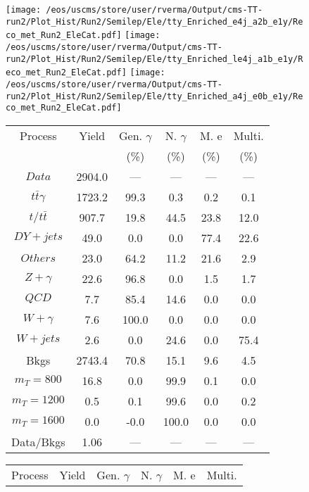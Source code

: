 \begin{figure}
\centering
\texttt{[image: /eos/uscms/store/user/rverma/Output/cms-TT-run2/Plot\_Hist/Run2/Semilep/Ele/tty\_Enriched\_e4j\_a2b\_e1y/Reco\_met\_Run2\_EleCat.pdf]}
\texttt{[image: /eos/uscms/store/user/rverma/Output/cms-TT-run2/Plot\_Hist/Run2/Semilep/Ele/tty\_Enriched\_le4j\_a1b\_e1y/Reco\_met\_Run2\_EleCat.pdf]}
\texttt{[image: /eos/uscms/store/user/rverma/Output/cms-TT-run2/Plot\_Hist/Run2/Semilep/Ele/tty\_Enriched\_a4j\_e0b\_e1y/Reco\_met\_Run2\_EleCat.pdf]}
\begin{minipage}[c]{0.32\textwidth}
\centering
\tiny{
\begin{tabular}{cccccc}
\hline
Process & Yield & Gen. $\gamma$ & N. $\gamma$ & M. e & Multi. \\
 &  & (\%) & (\%) & (\%) & (\%)  \\
\hline
                                                                      $ Data $ &  2904.0 &  --- &  --- &  --- &  ---\\
$ t\bar{t}\gamma $ &  1723.2 &  99.3 &  0.3 &  0.2 &  0.1\\
$ t/t\bar{t} $ &  907.7 &  19.8 &  44.5 &  23.8 &  12.0\\
$ DY+jets $ &  49.0 &  0.0 &  0.0 &  77.4 &  22.6\\
$ Others $ &  23.0 &  64.2 &  11.2 &  21.6 &  2.9\\
$ Z+\gamma $ &  22.6 &  96.8 &  0.0 &  1.5 &  1.7\\
$ QCD $ &  7.7 &  85.4 &  14.6 &  0.0 &  0.0\\
$ W+\gamma $ &  7.6 &  100.0 &  0.0 &  0.0 &  0.0\\
$ W+jets $ &  2.6 &  0.0 &  24.6 &  0.0 &  75.4\\
Bkgs &  2743.4 &  70.8 &  15.1 &  9.6 &  4.5\\
$ m_{T} = 800 $ &  16.8 &  0.0 &  99.9 &  0.1 &  0.0\\
$ m_{T} = 1200 $ &  0.5 &  0.1 &  99.6 &  0.0 &  0.2\\
$ m_{T} = 1600 $ &  0.0 &  -0.0 &  100.0 &  0.0 &  0.0\\
Data/Bkgs &  1.06 &  --- &  --- &  --- &  ---\\
\hline
\end{tabular}
}
\end{minipage}
\begin{minipage}[c]{0.32\textwidth}
\centering
\tiny{
\begin{tabular}{cccccc}
\hline
Process & Yield & Gen. $\gamma$ & N. $\gamma$ & M. e & Multi. \\

\end{tabular}}
\end{minipage}
\end{figure}
